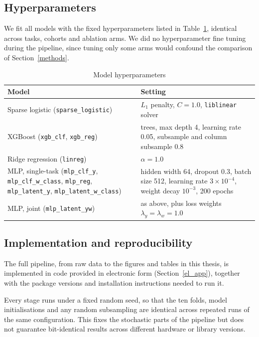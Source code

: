 \subsection{Hyperparameters}
We fit all models with the fixed hyperparameters listed in Table~\ref{tab:hyperparams}, identical
across tasks, cohorts and ablation arms. We did no hyperparameter fine tuning during the pipeline, 
since tuning only some arms would confound the comparison of Section~\ref{methods}.

\begin{table}[htbp]
  \centering
  \caption{Model hyperparameters}
  \label{tab:hyperparams}
  \begin{tabular}{>{\raggedright\arraybackslash}p{4.5cm} >{\raggedright\arraybackslash}p{10cm}}
    \hline
    Model & Setting \\
    \hline
    Sparse logistic (\texttt{sparse\_logistic}) & $L_1$ penalty, $C = 1.0$, \texttt{liblinear} solver \\
    XGBoost (\texttt{xgb\_clf}, \texttt{xgb\_reg}) & 500 trees, max depth 4, learning rate 0.05, subsample and column subsample 0.8 \\
    Ridge regression (\texttt{linreg}) & $\alpha = 1.0$ \\
    MLP, single-task (\texttt{mlp\_clf\_y}, \texttt{mlp\_clf\_w\_class}, \texttt{mlp\_reg}, \texttt{mlp\_latent\_y}, \texttt{mlp\_latent\_w\_class}) & hidden width 64, dropout 0.3, batch size 512, learning rate $3\times10^{-4}$, weight decay $10^{-3}$, 200 epochs \\
    MLP, joint (\texttt{mlp\_latent\_yw}) & as above, plus loss weights $\lambda_y = \lambda_w = 1.0$ \\
    \hline
  \end{tabular}
\end{table}

\subsection{Implementation and reproducibility}
The full pipeline, from raw data to the figures and tables in this thesis, is implemented in code
provided in electronic form (Section~\ref{el_app}), together with the package versions and
installation instructions needed to run it.

Every stage runs under a fixed random seed, so that the ten folds, model initialisations and any
random subsampling are identical across repeated runs of the same configuration. This fixes the
stochastic parts of the pipeline but does not guarantee bit-identical results across different
hardware or library versions.
